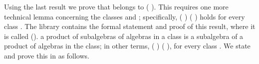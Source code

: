 \begin{code}%
\>[0]\<%
\\
\>[0][@{}l@{\AgdaIndent{1}}]%
\>[1]\AgdaSpace{}%
\AgdaSymbol{:}\AgdaSpace{}%
\AgdaSpace{}%
\AgdaOperator{\AgdaFunction{𝔽[}}\AgdaSpace{}%
\AgdaSpace{}%
\AgdaOperator{\AgdaFunction{]}}\AgdaSpace{}%
\<%
\\
%
\>[1]\AgdaSpace{}%
\AgdaSymbol{=}\AgdaSpace{}%
\AgdaSpace{}%
\AgdaSpace{}%
\AgdaSpace{}%
\AgdaOperator{\AgdaInductiveConstructor{,}}\AgdaSpace{}%
\<%
\\
\>[1][@{}l@{\AgdaIndent{0}}]%
\>[2]\<%
\\
%
\>[2]\AgdaSpace{}%
\AgdaSymbol{:}\AgdaSpace{}%
\AgdaSpace{}%
\AgdaOperator{\AgdaFunction{𝔽[}}\AgdaSpace{}%
\AgdaSpace{}%
\AgdaOperator{\AgdaFunction{]}}\AgdaSpace{}%
\AgdaSpace{}%
\AgdaSpace{}%
\AgdaSpace{}%
\<%
\\
%
\>[2]\AgdaSpace{}%
\AgdaSpace{}%
\AgdaSymbol{=}\AgdaSpace{}%
\AgdaSpace{}%
\AgdaSpace{}%
\<%
\\
%
\>[2]\AgdaSpace{}%
\AgdaSpace{}%
\AgdaSymbol{\{}\AgdaSymbol{\}\{}\AgdaSymbol{\}}\AgdaSpace{}%
\AgdaSpace{}%
\AgdaSymbol{=}\AgdaSpace{}%
\AgdaSpace{}%
\<%
\\
%
\\[\AgdaEmptyExtraSkip]%
%
\>[1]\AgdaSpace{}%
\AgdaSymbol{:}\AgdaSpace{}%
\AgdaOperator{\AgdaFunction{𝔽[}}\AgdaSpace{}%
\AgdaSpace{}%
\AgdaOperator{\AgdaFunction{]}}\AgdaSpace{}%
\AgdaSpace{}%
\<%
\\
%
\>[1]\AgdaSpace{}%
\AgdaSymbol{=}\AgdaSpace{}%
\AgdaSpace{}%
\<%
\\
\>[0]\<%
\end{code}
Using the last result we prove that  belongs to  ( ). This
requires one more technical lemma concerning the classes  and ; specifically,
\ifshort
{} ( )   ( ) holds for every class .
The \agdaalgebras library contains the formal statement and proof of this result, where
it is called  (\seeshort).
\else
a product of subalgebras of algebras in a class is a subalgebra of a product of algebras in the class;
in other terms,  ( )   ( ), for every class .
We state and prove this in \agda as follows.

